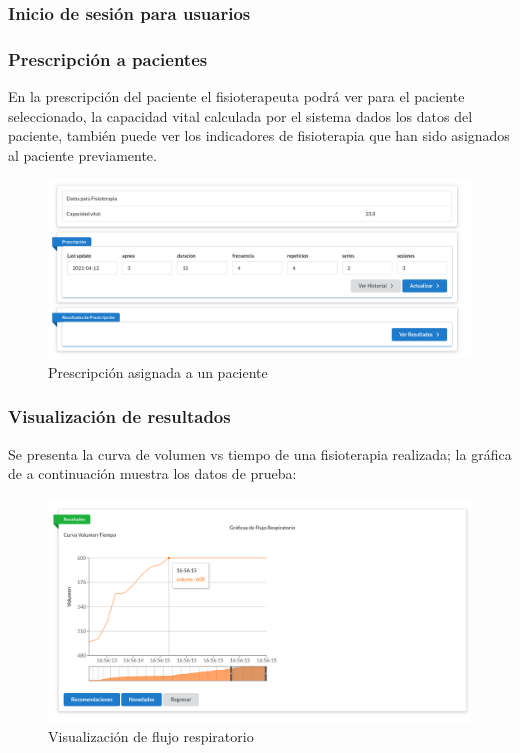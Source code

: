 \documentclass[12pt]{article}
\begin{document}
\subsubsection{Inicio de sesión para usuarios}


\subsubsection{Prescripción a pacientes}


En la prescripción del paciente el fisioterapeuta podrá ver para el paciente seleccionado, la capacidad vital calculada por el sistema dados los datos del paciente, también puede ver los indicadores de fisioterapia que han sido asignados al paciente previamente.

\begin{figure}[ht]
\centering
\includegraphics[scale=0.36]{imag/prescriapp.png}
\caption{Prescripción asignada a un paciente}
\label{6}
\end{figure}
\FloatBarrier


\subsubsection{Visualización de resultados}

Se presenta la curva de volumen vs tiempo de una fisioterapia realizada; la gráfica de a continuación muestra los datos de prueba:

\begin{figure}[ht]
\centering
\includegraphics[scale=0.43]{imag/volumetiempoapp.png}
\caption{Visualización de flujo respiratorio}
\label{6}
\end{figure}
\FloatBarrier
\end{document}
